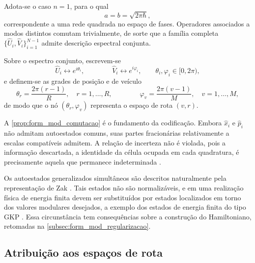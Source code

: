         \bigskip

        Adota-se o caso $n = 1$, para o qual
        \begin{equation}\label{eq:form_mod_rede}
            a = b = \sqrt{2\pi\hbar} ,
        \end{equation}
        \noindent correspondente a uma rede quadrada no espaço de fases. Operadores associados a modos distintos comutam trivialmente, de sorte que a família completa $\{\hat{U}_i, \hat{V}_i\}_{i=1}^{N-1}$ admite descrição espectral conjunta.

        Sobre o espectro conjunto, escrevem-se
        \begin{equation}\label{eq:form_mod_autofases}
            \hat{U}_i \longleftrightarrow e^{i\theta_i} ,
            \qquad\qquad
            \hat{V}_i \longleftrightarrow e^{i\varphi_i} ,
            \qquad \theta_i, \varphi_i \in [0, 2\pi) ,
        \end{equation}
        \noindent e definem-se as grades de posição e de veículo
        \begin{equation}\label{eq:form_mod_nos}
            \theta_r = \frac{2\pi (r-1)}{R}, \quad r = 1, \dots, R ,
            \qquad\qquad
            \varphi_v = \frac{2\pi (v-1)}{M}, \quad v = 1, \dots, M ,
        \end{equation}
        \noindent de modo que o nó $(\theta_r, \varphi_v)$ representa o espaço de rota $(v, r)$.

        A \autoref{prop:form_mod_comutacao} é o fundamento da codificação. Embora $\hat{x}_i$ e $\hat{p}_i$ não admitam autoestados comuns, suas partes fracionárias relativamente a escalas compatíveis admitem. A relação de incerteza não é violada, pois a informação descartada, a identidade da célula ocupada em cada quadratura, é precisamente aquela que permanece indeterminada \cite{?}.

        Os autoestados generalizados simultâneos são descritos naturalmente pela representação de Zak \cite{?}. Tais estados não são normalizáveis, e em uma realização física de energia finita devem ser substituídos por estados localizados em torno dos valores modulares desejados, a exemplo dos estados de energia finita do tipo GKP \cite{?}. Essa circunstância tem consequências sobre a construção do Hamiltoniano, retomadas na \autoref{subsec:form_mod_regularizacao}.

    \subsection{Atribuição aos espaços de rota}\label{subsec:form_mod_fejer}

